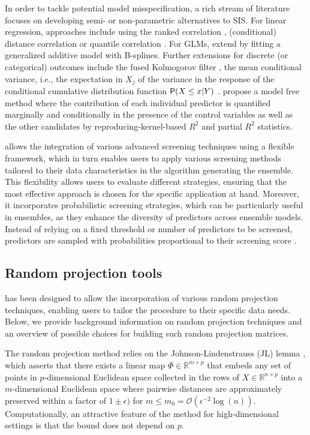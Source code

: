 \documentclass[
  article]{jss}
\begin{document}
In order to tackle potential model misspecification, a rich stream of
literature focuses on developing semi- or non-parametric alternatives to
SIS. For linear regression, approaches include using the ranked
correlation \citep{zhu2011model}, (conditional) distance correlation
\citep{li2012feature, wang2015conditional} or quantile correlation
\citep{ma2016robust}. For GLMs, \citet{fan2011nonparametric} extend
\citet{Fan2010sisglms} by fitting a generalized additive model with
B-splines. Further extensions for discrete (or categorical) outcomes
include the fused Kolmogorov filter \citep{mai2013kolmogorov}, the mean
conditional variance, i.e., the expectation in \(X_j\) of the variance
in the response of the conditional cumulative distribution function
\(\mathsf{P}(X\leq x|Y)\) \citep{cui2015model}. \citet{ke2023sufficient}
propose a model free method where the contribution of each individual
predictor is quantified marginally and conditionally in the presence of
the control variables as well as the other candidates by
reproducing-kernel-based \(R^2\) and partial \(R^2\) statistics.

 allows the integration of various advanced screening
techniques using a flexible framework, which in turn enables users to
apply various screening methods tailored to their data characteristics
in the algorithm generating the ensemble. This flexibility allows users
to evaluate different strategies, ensuring that the most effective
approach is chosen for the specific application at hand. Moreover, it
incorporates probabilistic screening strategies, which can be
particularly useful in ensembles, as they enhance the diversity of
predictors across ensemble models. Instead of relying on a fixed
threshold or number of predictors to be screened, predictors are sampled
with probabilities proportional to their screening score
\citep[see][]{Dunson2020TargRandProj, parzer2024glms}.

\subsection{Random projection tools}\label{sec-rps}

 has been designed to allow the incorporation of various
random projection techniques, enabling users to tailor the procedure to
their specific data needs. Below, we provide background information on
random projection techniques and an overview of possible choices for
building such random projection matrices.

The random projection method relies on the Johnson-Lindenstrauss (JL)
lemma \citep{JohnsonLindenstrauss1984}, which asserts that there exists
a linear map \(\Phi\in \mathbb{R}^{m \times p}\) that embeds any set of
points in \(p\)-dimensional Euclidean space collected in the rows of
\(X\in \mathbb{R}^{n\times p}\) into a \(m\)-dimensional Euclidean space
where pairwise distances are approximately preserved within a factor of
\(1\pm\epsilon)\) for \(m\leq m_0=\mathcal O(\epsilon^{-2}\log(n))\).
Computationally, an attractive feature of the method for
high-dimensional settings is that the bound does not depend on \(p\).
\end{document}
